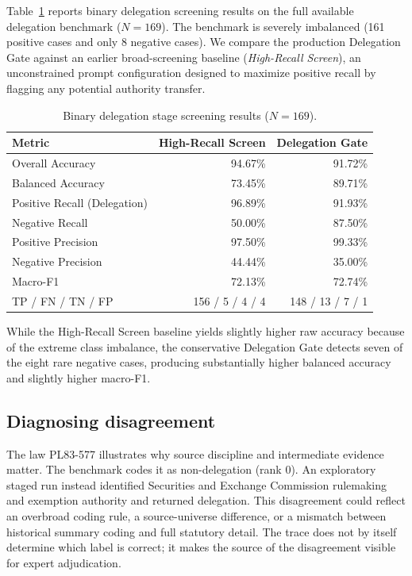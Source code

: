 \documentclass[conference]{IEEEtran}
\begin{document}
Table~\ref{tab:binary} reports binary delegation screening results on the full available delegation benchmark ($N=169$). The benchmark is severely imbalanced (161 positive cases and only 8 negative cases). We compare the production Delegation Gate against an earlier broad-screening baseline (\emph{High-Recall Screen}), an unconstrained prompt configuration designed to maximize positive recall by flagging any potential authority transfer.
 

\begin{table}[htbp]
\centering
\caption{Binary delegation stage screening results ($N=169$).}
\label{tab:binary}
\small
\begin{tabular}{@{}l@{\hspace{3pt}}rr@{}}
\toprule
\textbf{Metric} & \textbf{High-Recall Screen} & \textbf{Delegation Gate} \\
\midrule
Overall Accuracy & 94.67\% & 91.72\% \\
Balanced Accuracy & 73.45\% & 89.71\% \\
Positive Recall (Delegation) & 96.89\% & 91.93\% \\
Negative Recall & 50.00\% & 87.50\% \\
Positive Precision & 97.50\% & 99.33\% \\
Negative Precision & 44.44\% & 35.00\% \\
Macro-F1 & 72.13\% & 72.74\% \\
\midrule
TP / FN / TN / FP & 156 / 5 / 4 / 4 & 148 / 13 / 7 / 1 \\
\bottomrule
\end{tabular}
\end{table}

While the High-Recall Screen baseline yields slightly higher raw accuracy because of the extreme class imbalance, the conservative Delegation Gate detects seven of the eight rare negative cases, producing substantially higher balanced accuracy and slightly higher macro-F1.

\subsection{Diagnosing disagreement}

The law PL83-577 illustrates why source discipline and intermediate evidence matter. The benchmark codes it as non-delegation (rank 0). An exploratory staged run instead identified Securities and Exchange Commission rulemaking and exemption authority and returned delegation. This disagreement could reflect an overbroad coding rule, a source-universe difference, or a mismatch between historical summary coding and full statutory detail. The trace does not by itself determine which label is correct; it makes the source of the disagreement visible for expert adjudication.
\end{document}

